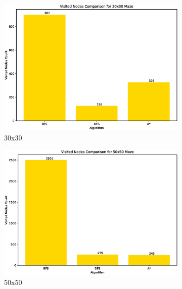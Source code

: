 \documentclass{article}
\begin{document}
\begin{figure}[htbp]
\begin{subfigure}[b]{0.45\textwidth}
        \includegraphics[width=\textwidth]{imgs/Visited-30-30.eps}
        \caption{30x30}
    \end{subfigure}
    \begin{subfigure}[b]{0.45\textwidth}
        \centering
        \includegraphics[width=\textwidth]{imgs/Visited-50-50.eps}
        \caption{50x50}
    \end{subfigure}
    \newline
    \begin{subfigure}[b]{0.45\textwidth}
        \centering

\end{subfigure}
\end{figure}
\end{document}
